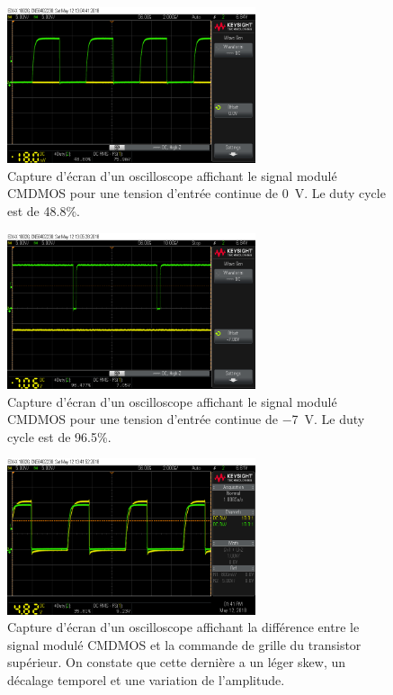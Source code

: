 \documentclass[10pt, oneside, a4paper]{article}
\begin{document}
\begin{figure}[p]
	\centering
	\includegraphics[width=0.65\textwidth]{image/12-05/scope_3.png}
	\caption{Capture d'écran d'un oscilloscope affichant le signal modulé CMDMOS pour une
			 tension d'entrée continue de \SI{0}{\volt}. Le duty cycle est de \num{48.8}\%.}
	\label{fig:scope-3}
\end{figure}

\begin{figure}[p]
	\centering
	\includegraphics[width=0.65\textwidth]{image/12-05/scope_4.png}
	\caption{Capture d'écran d'un oscilloscope affichant le signal modulé CMDMOS pour une
			 tension d'entrée continue de \SI{-7}{\volt}. Le duty cycle est de \num{96.5}\%.}
	\label{fig:scope-4}
\end{figure}

\begin{figure}[p]
	\centering
	\includegraphics[width=0.65\textwidth]{image/12-05/scope_5.png}
	\caption{Capture d'écran d'un oscilloscope affichant la différence entre le signal
			 modulé CMDMOS et la commande de grille du transistor supérieur.
			 On constate que cette dernière a un léger \og{}skew\fg{}, un décalage
			 temporel et une  variation de l'amplitude.}
	\label{fig:scope-5}
\end{figure}
\end{document}
